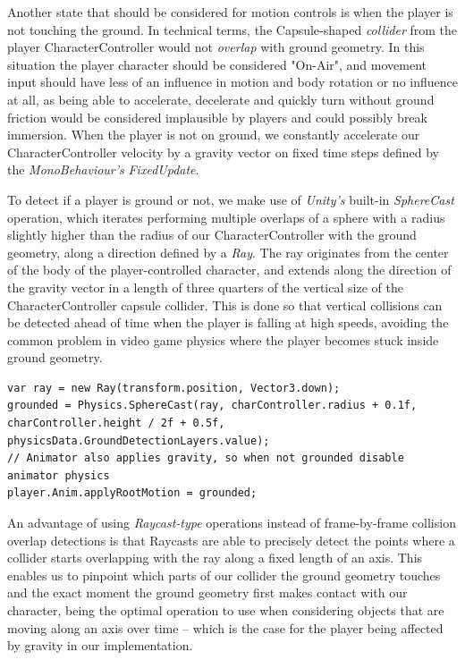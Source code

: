 Another state that should be considered for motion controls is when the player is not touching the ground. In technical terms, the Capsule-shaped \emph{collider} from the player CharacterController would not \emph{overlap} with ground geometry. In this situation the player character should be considered "On-Air", and movement input should have less of an influence in motion and body rotation or no influence at all, as being able to accelerate, decelerate and quickly turn without ground friction would be considered implausible by players and could possibly break immersion. When the player is not on ground, we constantly accelerate our CharacterController velocity by a gravity vector on fixed time steps defined by the \emph{MonoBehaviour's} \emph{FixedUpdate}.


To detect if a player is ground or not, we make use of \emph{Unity's} built-in \emph{SphereCast} operation, which iterates performing multiple overlaps of a sphere with a radius slightly higher than the radius of our CharacterController with the ground geometry, along a direction defined by a \emph{Ray}. The ray originates from the center of the body of the player-controlled character, and extends along the direction of the gravity vector in a length of three quarters of the vertical size of the CharacterController capsule collider. This is done so that vertical collisions can be detected ahead of time when the player is falling at high speeds, avoiding the common problem in video game physics where the player becomes stuck inside ground geometry.

\begin{lstlisting}[caption={Implementation of grounded state detection.},label={lst:grounded-detection}]
var ray = new Ray(transform.position, Vector3.down);
grounded = Physics.SphereCast(ray, charController.radius + 0.1f, charController.height / 2f + 0.5f, physicsData.GroundDetectionLayers.value);
// Animator also applies gravity, so when not grounded disable animator physics
player.Anim.applyRootMotion = grounded;
\end{lstlisting}

An advantage of using \emph{Raycast-type} operations instead of frame-by-frame collision overlap detections is that Raycasts are able to precisely detect the points where a collider starts overlapping with the ray along a fixed length of an axis. This enables us to pinpoint which parts of our collider the ground geometry touches and the exact moment the ground geometry first makes contact with our character, being the optimal operation to use when considering objects that are moving along an axis over time -- which is the case for the player being affected by gravity in our implementation.

